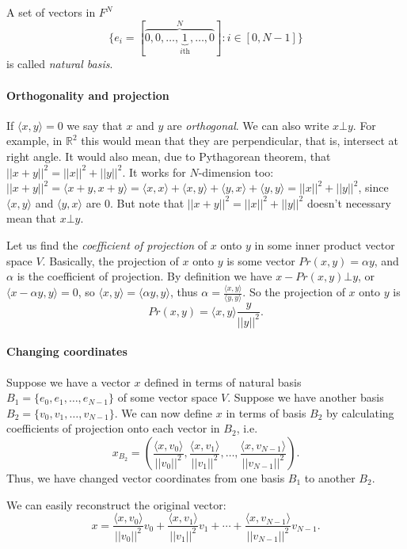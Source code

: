 \documentclass[10pt]{article}
\begin{document}
A set of vectors in $F^N$ $$ \{ e_i = [\overbrace{0, 0, \ldots,
\underbrace{1}_{\mbox{$i$th}}, \ldots, 0}^{N}] : i \in [0, N-1] \}$$
is called {\it natural basis}.

\paragraph {Orthogonality and projection} If $\langle x, y \rangle=0$ we say
that $x$ and $y$ are {\it orthogonal}. We can also write $x \bot y$. For
example, in $\mathbb{R}^2$ this would mean that they are perpendicular, that is,
intersect at right angle. It would also mean, due to Pythagorean theorem, that
$||x+y||^2=||x||^2 + ||y||^2$. It works for $N$-dimension too:
$||x+y||^2=\langle x+y, x+y \rangle = \langle x, x \rangle + \langle x, y
\rangle + \langle y, x \rangle + \langle y, y \rangle = ||x||^2 + ||y||^2$,
since $\langle x, y \rangle$ and $\langle y, x \rangle$ are $0$. But note that
$||x+y||^2=||x||^2+||y||^2$ doesn't necessary mean that $x \bot y$.

Let us find the {\it coefficient of projection} of $x$ onto $y$ in some inner
product vector space $V$. Basically, the projection of $x$ onto $y$ is some
vector $Pr(x, y) = \alpha y$, and $\alpha$ is the coefficient of projection. By
definition we have $x - Pr(x,y) \bot y$, or $\langle x - \alpha y, y \rangle
=0$, so $\langle x, y \rangle = \langle \alpha y, y \rangle$, thus $\alpha =
\frac{\langle x, y \rangle}{\langle y, y \rangle}$. So the projection of $x$
onto $y$ is $$Pr(x, y) = \langle x, y \rangle \frac{y}{||y||^2}.$$

\paragraph{Changing coordinates} Suppose we have a vector $x$ defined in terms
of natural basis $B_1 = \{e_0, e_1, \ldots, e_{N-1}\}$ of some vector space
$V$. Suppose we have another basis $B_2=\{v_0, v_1, \ldots, v_{N-1}\}$. We can
now define $x$ in terms of basis $B_2$ by calculating coefficients of
projection onto each vector in $B_2$, i.e.  $$x_{B_2} = \left(\frac{\langle x,
v_0 \rangle }{||v_0||^2}, \frac{\langle x,
v_1 \rangle }{||v_1||^2} , \ldots, \frac{\langle x, v_{N-1} \rangle
}{||v_{N-1}||^2}\right).$$ Thus, we have changed vector coordinates from one
basis $B_1$ to another $B_2$.

We can easily reconstruct the original vector:
$$x=\frac{\langle x, v_0 \rangle }{||v_0||^2}v_0 + \frac{\langle
x, v_1 \rangle }{||v_1||^2}v_1 + \cdots + \frac{\langle x, v_{N-1} \rangle
}{||v_{N-1}||^2}v_{N-1}.$$
\end{document}
